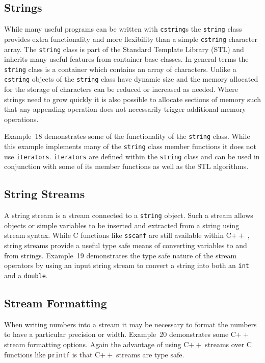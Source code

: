 \documentclass[11pt,a4paper]{scrartcl}
\def\cpp{C$++\;$}
\begin{document}

\subsection{Strings}
While many useful programs can be written with \texttt{cstring}s the
\texttt{string} class provides extra functionality and more
flexibility than a simple \texttt{cstring} character array.  The
\texttt{string} class is part of the Standard Template Library (STL)
and inherits many useful features from container base classes.  In
general terms the \texttt{string} class is a container which contains
an array of characters.  Unlike a \texttt{cstring} objects of the
\texttt{string} class have dynamic size and the memory allocated for
the storage of characters can be reduced or increased as needed.  Where
strings need to grow quickly it is also possible to allocate sections
of memory such that any appending operation does not necessarily
trigger additional memory operations.

Example~18 demonstrates some of the functionality of the
\texttt{string} class.  While this example implements many of the
\texttt{string} class member functions it does not use
\texttt{iterators}.  \texttt{iterators} are defined within the \texttt{string}
class and can be used in conjunction with some of its member functions
as well as the STL algorithms.


\subsection{String Streams}
A string stream is a stream connected to a \texttt{string} object.
Such a stream allows objects or simple variables to be inserted and
extracted from a string using stream syntax.  While C functions like
\texttt{sscanf} are still available within \cpp, string streams provide a
useful type safe means of converting variables to and from strings.
Example~19 demonstrates the type safe nature of the stream operators by
using an input string stream to convert a string into both an
\texttt{int} and a \texttt{double}.


\subsection{Stream Formatting}
When writing numbers into a stream it may be necessary to format the
numbers to have a particular precision or width.  Example~20
demonstrates some \cpp stream formatting options.  Again the advantage
of using \cpp streams over C functions like \texttt{printf} is that
\cpp streams are type safe.
\end{document}

